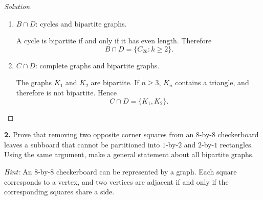 \documentclass[12pt]{amsart}
\theoremstyle{conjecture}
\theoremstyle{definition}
\theoremstyle{question}
\theoremstyle{theorem}
\newenvironment{solution}
{\begin{proof}[Solution]}
{\end{proof}}
\begin{document}
\begin{solution}
\begin{enumerate}[label=(\alph*)]
            \item $B\cap D$: cycles and bipartite graphs.

            A cycle is bipartite if and only if it has even length.
            Therefore
            \[
                B\cap D=\{C_{2k}:k\geq 2\}.
            \]

            \item $C\cap D$: complete graphs and bipartite graphs.

            The graphs $K_1$ and $K_2$ are bipartite. If $n\geq 3$,
            $K_n$ contains a triangle, and therefore is not bipartite.
            Hence
            \[
                C\cap D=\{K_1,K_2\}.
            \]
        \end{enumerate}
    \end{solution}

    \textbf{2.} Prove that removing two opposite corner squares from an
    $8$-by-$8$ checkerboard leaves a subboard that cannot be partitioned
    into $1$-by-$2$ and $2$-by-$1$ rectangles. Using the same argument,
    make a general statement about all bipartite graphs.

    \medskip

    \noindent
    \textit{Hint:} An $8$-by-$8$ checkerboard can be represented by a graph.
    Each square corresponds to a vertex, and two vertices are adjacent if
    and only if the corresponding squares share a side.
\end{document}
